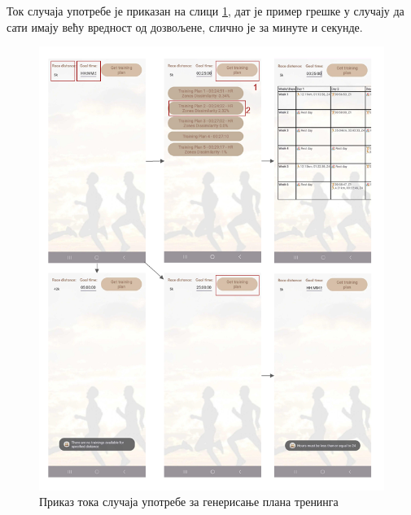 \documentclass[12pt,oneside]{memoir}
\begin{document}
\noindent Ток случаја употребе је приказан на слици \ref{pic:training-plan-flow}, дат је пример грешке у случају да сати имају већу вредност од дозвољене, слично је за минуте и секунде.

\begin{figure}[H]
  \centering
  \includegraphics[scale=0.88]{assets/pictures/usecases_flows/training_plan_flow.png}
    \caption{Приказ тока случаја употребе за генерисање плана тренинга}
  \label{pic:training-plan-flow}
\end{figure}



\newpage
\end{document}
